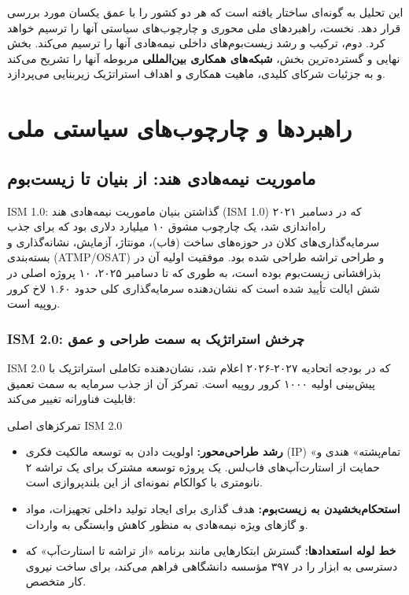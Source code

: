 \documentclass[10pt]{report}
\begin{document}
این تحلیل به گونه‌ای ساختار یافته است که هر دو کشور را با عمق یکسان مورد بررسی قرار دهد. نخست، راهبردهای ملی محوری و چارچوب‌های سیاستی آنها را ترسیم خواهد کرد. دوم، ترکیب و رشد زیست‌بوم‌های داخلی نیمه‌هادی آنها را ترسیم می‌کند. بخش نهایی و گسترده‌ترین بخش، \textbf{شبکه‌های همکاری بین‌المللی} مربوطه آنها را تشریح می‌کند و به جزئیات شرکای کلیدی، ماهیت همکاری و اهداف استراتژیک زیربنایی می‌پردازد.

\chapter{راهبردها و چارچوب‌های سیاستی ملی}

\section{ماموریت نیمه‌هادی هند: از بنیان تا زیست‌بوم}

\begin{indiabox}{ISM 1.0: گذاشتن بنیان}
ماموریت نیمه‌هادی هند (ISM 1.0) که در دسامبر ۲۰۲۱ راه‌اندازی شد، یک چارچوب مشوق ۱۰ میلیارد دلاری بود که برای جذب سرمایه‌گذاری‌های کلان در حوزه‌های ساخت (فاب)، مونتاژ، آزمایش، نشانه‌گذاری و بسته‌بندی (ATMP/OSAT) و طراحی تراشه طراحی شده بود. موفقیت اولیه آن در بذرافشانی زیست‌بوم بوده است، به طوری که تا دسامبر ۲۰۲۵، ۱۰ پروژه اصلی در شش ایالت تأیید شده است که نشان‌دهنده سرمایه‌گذاری کلی حدود ۱.۶۰ لاخ کرور روپیه است.
\end{indiabox}

\subsection{ISM 2.0: چرخش استراتژیک به سمت طراحی و عمق}
ISM 2.0 که در بودجه اتحادیه ۲۰۲۷-۲۰۲۶ اعلام شد، نشان‌دهنده تکاملی استراتژیک با پیش‌بینی اولیه ۱۰۰۰ کرور روپیه است. تمرکز آن از جذب سرمایه به سمت تعمیق قابلیت فناورانه تغییر می‌کند:

\begin{comparisonbox}{تمرکز‌های اصلی ISM 2.0}
\begin{itemize}
    \item \textbf{رشد طراحی‌محور:} اولویت دادن به توسعه مالکیت فکری (IP) «تمام‌پشته» هندی و حمایت از استارت‌آپ‌های فاب‌لس. یک پروژه توسعه مشترک برای یک تراشه ۲ نانومتری با کوالکام نمونه‌ای از این بلندپروازی است.
    \item \textbf{استحکام‌بخشیدن به زیست‌بوم:} هدف گذاری برای ایجاد تولید داخلی تجهیزات، مواد و گازهای ویژه نیمه‌هادی به منظور کاهش وابستگی به واردات.
    \item \textbf{خط لوله استعدادها:} گسترش ابتکارهایی مانند برنامه «از تراشه تا استارت‌آپ» که دسترسی به ابزار را در ۳۹۷ مؤسسه دانشگاهی فراهم می‌کند، برای ساخت نیروی کار متخصص.
\end{itemize}
\end{comparisonbox}
\end{document}
